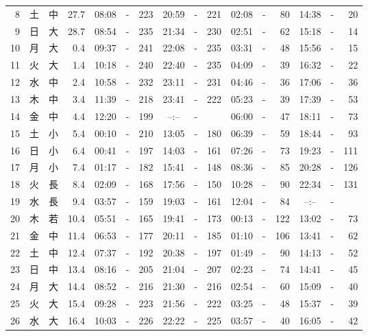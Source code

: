 \documentclass[12pt.a4j]{jsarticle}
\begin{document}
\begin{center}
\begin{table}[ht]
\begin{tabular}{|rc|cr|ccrccr|ccrccr|}
 8 & 土 & 中 & 27.7 &  08:08 &-& 223  &  20:59 &-& 221  &   02:08 &-&  80  &   14:38 &-&  20  \\
 9 & 日 & 大 & 28.7 &  08:54 &-& 235  &  21:34 &-& 230  &   02:51 &-&  62  &   15:18 &-&  14  \\
10 & 月 & 大 &  0.4 &  09:37 &-& 241  &  22:08 &-& 235  &   03:31 &-&  48  &   15:56 &-&  15  \\
11 & 火 & 大 &  1.4 &  10:18 &-& 240  &  22:40 &-& 235  &   04:09 &-&  39  &   16:32 &-&  22  \\
12 & 水 & 中 &  2.4 &  10:58 &-& 232  &  23:11 &-& 231  &   04:46 &-&  36  &   17:06 &-&  36  \\
13 & 木 & 中 &  3.4 &  11:39 &-& 218  &  23:41 &-& 222  &   05:23 &-&  39  &   17:39 &-&  53  \\
14 & 金 & 中 &  4.4 &  12:20 &-& 199  &  --:-- &-&     &   06:00 &-&  47  &   18:11 &-&  73  \\
15 & 土 & 小 &  5.4 &  00:10 &-& 210  &  13:05 &-& 180  &   06:39 &-&  59  &   18:44 &-&  93  \\
16 & 日 & 小 &  6.4 &  00:41 &-& 197  &  14:03 &-& 161  &   07:26 &-&  73  &   19:23 &-& 111  \\
17 & 月 & 小 &  7.4 &  01:17 &-& 182  &  15:41 &-& 148  &   08:36 &-&  85  &   20:28 &-& 126  \\
18 & 火 & 長 &  8.4 &  02:09 &-& 168  &  17:56 &-& 150  &   10:28 &-&  90  &   22:34 &-& 131  \\
19 & 水 & 長 &  9.4 &  03:57 &-& 159  &  19:03 &-& 161  &   12:04 &-&  84  &   --:-- &-&     \\
20 & 木 & 若 & 10.4 &  05:51 &-& 165  &  19:41 &-& 173  &   00:13 &-& 122  &   13:02 &-&  73  \\
21 & 金 & 中 & 11.4 &  06:53 &-& 177  &  20:11 &-& 185  &   01:10 &-& 106  &   13:41 &-&  62  \\
22 & 土 & 中 & 12.4 &  07:37 &-& 192  &  20:38 &-& 197  &   01:49 &-&  90  &   14:13 &-&  52  \\
23 & 日 & 中 & 13.4 &  08:16 &-& 205  &  21:04 &-& 207  &   02:23 &-&  74  &   14:41 &-&  45  \\
24 & 月 & 大 & 14.4 &  08:52 &-& 216  &  21:30 &-& 216  &   02:54 &-&  60  &   15:09 &-&  40  \\
25 & 火 & 大 & 15.4 &  09:28 &-& 223  &  21:56 &-& 222  &   03:25 &-&  48  &   15:37 &-&  39  \\
26 & 水 & 大 & 16.4 &  10:03 &-& 226  &  22:22 &-& 225  &   03:57 &-&  40  &   16:05 &-&  42  \\

\end{tabular}
\end{table}
\end{center}
\end{document}
